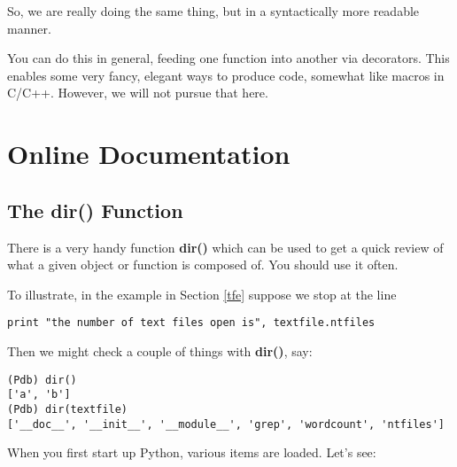 So, we are really doing the same thing, but in a syntactically more
readable manner.

You can do this in general, feeding one function into another via
decorators.  This enables some very fancy, elegant ways to produce code,
somewhat like macros in C/C++.  However, we will not pursue that here.

\section{Online Documentation}
\label{online}

\subsection{The dir() Function}
\label{dirftn}

There is a very handy function {\bf dir()} which can be used to get a
quick review of what a given object or function is composed of.  You
should use it often.

To illustrate, in the example in Section \ref{tfe} suppose we stop at
the line 

\begin{Verbatim}[fontsize=\relsize{-2}]
print "the number of text files open is", textfile.ntfiles
\end{Verbatim}

Then we might check a couple of things with {\bf dir()}, say:

\begin{Verbatim}[fontsize=\relsize{-2}]
(Pdb) dir()
['a', 'b']
(Pdb) dir(textfile)
['__doc__', '__init__', '__module__', 'grep', 'wordcount', 'ntfiles']
\end{Verbatim}

When you first start up Python, various items are loaded.  Let's see:

